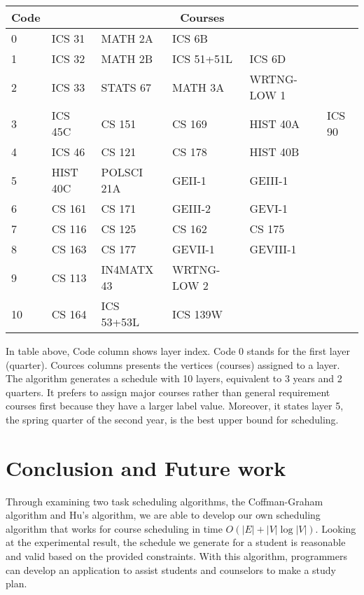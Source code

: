 \documentclass[letterpaper,12pt]{article}
\theoremstyle{definition}
\begin{document}
\begin{center}
\begin{tabular}{|m{1cm}|m{2cm}|m{2cm}|m{2cm}|m{2cm}|m{2cm}|}
\hline
\textbf{Code} & \multicolumn{5}{c|}{\textbf{Courses}}                                                  \\ \hline
0            & ICS 31  & MATH 2A        & ICS 6B      &                 &            \\ \hline
1            & ICS 32  & MATH 2B        & ICS 51+51L      & ICS 6D      &            \\ \hline
2            & ICS 33  & STATS 67       & MATH 3A         & WRTNG-LOW 1 &            \\ \hline
3            & ICS 45C & CS 151    & CS 169     & HIST 40A     & ICS 90 \\ \hline
4            & ICS 46  & CS 121    & CS 178     & HIST 40B     &            \\ \hline
5            & HIST 40C & POLSCI 21A     & GEII-1          & GEIII-1         &            \\ \hline
6            & CS 161 & CS 171    & GEIII-2         & GEVI-1          &            \\ \hline
7            & CS 116 & CS 125    & CS 162     & CS 175     &            \\ \hline
8            & CS 163 & CS 177    & GEVII-1         & GEVIII-1        &            \\ \hline
9            & CS 113 & IN4MATX 43     & WRTNG-LOW 2 &                 &            \\ \hline
10           & CS 164 & ICS 53+53L & ICS 139W    &                 &            \\ \hline
\end{tabular}
\end{center}
In table above, Code column shows layer index. Code $0$ stands for the first layer (quarter). Cources columns presents the vertices (courses) assigned to a layer. The algorithm generates a schedule with 10 layers, equivalent to 3 years and 2 quarters. It prefers to assign major courses rather than general requirement courses first because they have a larger label value. Moreover, it states layer 5, the spring quarter of the second year, is the best upper bound for scheduling. 
\section{Conclusion and Future work}
Through examining two task scheduling algorithms, the Coffman-Graham algorithm and Hu's algorithm, we are able to develop our own scheduling algorithm that works for course scheduling in time $O(|E|+|V|\log|V|)$. Looking at the experimental result, the schedule we generate for a student is reasonable and valid based on the provided constraints. With this algorithm, programmers can develop an application to assist students and counselors to make a study plan. 
\end{document}
